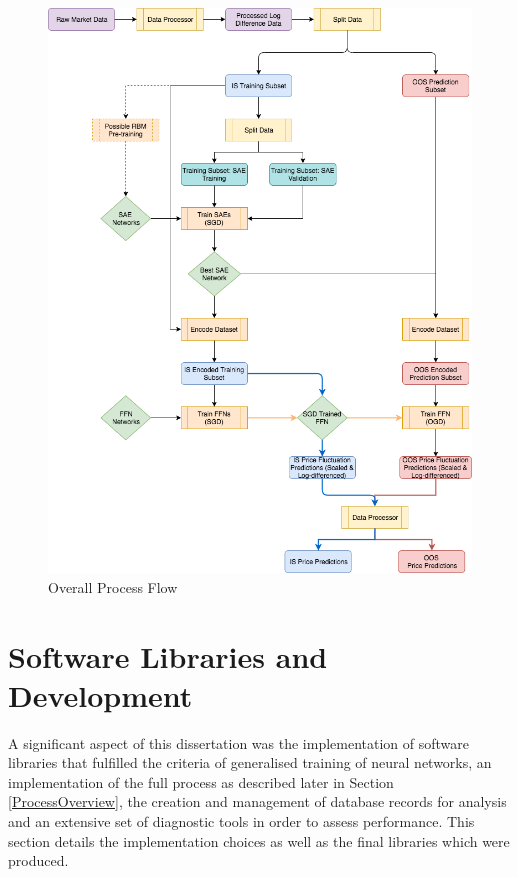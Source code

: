 \documentclass[a4paper,11pt,oneside]{article}
\theoremstyle{plain}
\theoremstyle{definition}
\begin{document}
	\begin{figure}[H]
		\centering \includegraphics[scale=0.6]{images/process_implementation/process_flow.png}
		\caption[Overall Process Flow Diagram]{Overall Process Flow}
		\label{figure-proc_diagram}
	\end{figure}
	
	
	
	
	
	
	
	
	
	
	
	
	
	
	
		\newpage
		\section{Software Libraries and Development}\label{Software}
	
	A significant aspect of this dissertation was the implementation of software libraries that fulfilled the criteria of generalised training of neural networks, an implementation of the full process as described later in Section \ref{ProcessOverview}, the creation and management of database records for analysis and an extensive set of diagnostic tools in order to assess performance. This section details the implementation choices as well as the final libraries which were produced.
	
\end{document}
